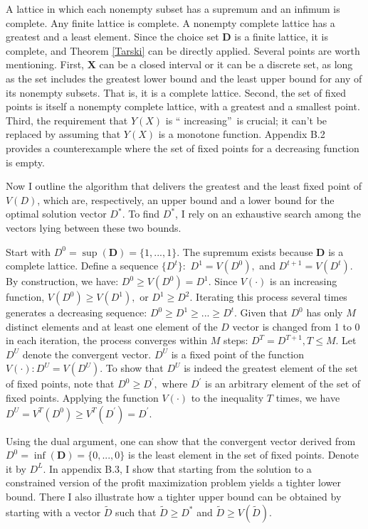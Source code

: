 \documentclass[notitlepage,onecolumn,11pt]{article}
\begin{document}
A lattice in which each nonempty subset has a supremum and an infimum is
complete. Any finite lattice is complete. A nonempty complete lattice has a
greatest and a least element. Since the choice set $\mathbf{D}$ is a finite
lattice, it is complete, and Theorem \ref{Tarski} can be directly applied.
Several points are worth mentioning. First, $\mathbf{X}$ can be a closed
interval or it can be a discrete set, as long as the set includes the
greatest lower bound and the least upper bound for any of its nonempty
subsets. That is, it is a complete lattice. Second, the set of fixed points
is itself a nonempty complete lattice, with a greatest and a smallest point.
Third, the requirement that $Y(X)$ is \textquotedblleft
increasing\textquotedblright\ is crucial; it can't be replaced by assuming
that $Y(X)$ is a monotone function. Appendix B.2 provides a counterexample
where the set of fixed points for a decreasing function is empty.

Now I outline the algorithm that delivers the greatest and the least fixed
point of $V(D)$, which are, respectively, an upper bound and a lower bound
for the optimal solution vector $D^{\ast }.$ To find $D^{\ast }$, I rely on
an exhaustive search among the vectors lying between these two bounds.

Start with $D^{0}=\sup (\mathbf{D})=\{1,...,1\}.$ The supremum exists
because $\mathbf{D}$ is a complete lattice. Define a sequence $\{D^{t}\}:$ $%
D^{1}=V(D^{0}),$ and $D^{t+1}=V(D^{t}).$ By construction, we have: $%
D^{0}\geq V(D^{0})=D^{1}.$ Since $V(\cdot )$ is an increasing function, $%
V(D^{0})\geq V(D^{1}),$ or $D^{1}\geq D^{2}.$ Iterating this process several
times generates a decreasing sequence: $D^{0}\geq D^{1}\geq ...\geq D^{t}.$
Given that $D^{0}$ has only $M$ distinct elements and at least one element
of the $D$ vector is changed from 1 to 0 in each iteration, the process
converges within $M$ steps: $D^{T}=D^{T+1},T\leq M.$ Let $D^{U}$ denote the
convergent vector. $D^{U}$ is a fixed point of the function $V(\cdot
):D^{U}=V(D^{U}).$ To show that $D^{U}$ is indeed the greatest element of
the set of fixed points, note that $D^{0}\geq D^{\prime },$ where $D^{\prime
}$ is an arbitrary element of the set of fixed points. Applying the function 
$V(\cdot )$ to the inequality $T$ times, we have $D^{U}=V^{T}(D^{0})\geq
V^{T}(D^{\prime })=D^{\prime }.$

Using the dual argument, one can show that the convergent vector derived
from $D^{0}=\inf (\mathbf{D})=\{0,...,0\}$ is the least element in the set
of fixed points. Denote it by $D^{L}.$ In appendix B.3, I show that starting
from the solution to a constrained version of the profit maximization
problem yields a tighter lower bound. There I also illustrate how a tighter
upper bound can be obtained by starting with a vector $\tilde{D}$ such that $%
\tilde{D}\geq D^{\ast }$ and $\tilde{D}\geq V(\tilde{D}).$
\end{document}
